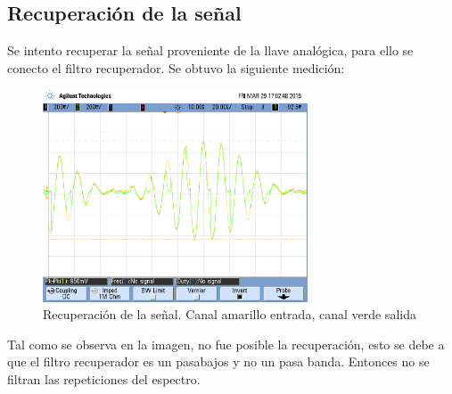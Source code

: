 \documentclass[../../ASSD_TP1_G7.tex]{subfiles}
\begin{document}
\subsection*{Recuperación de la se\~nal}
Se intento recuperar la se\~nal proveniente de la llave analógica, para ello se conecto el filtro recuperador. Se obtuvo la siguiente medición:

\begin{figure}[H]
  \centering
   \includegraphics[width=0.7\textwidth]{figures/lla_8_1.png}
  \caption{Recuperación de la se\~nal. Canal amarillo entrada, canal verde salida }
  
\end{figure}
Tal como se observa en la imagen, no fue posible la recuperación, esto se debe a que el filtro recuperador es un pasabajos y no un pasa banda. Entonces no se filtran las repeticiones del espectro.
\end{document}
